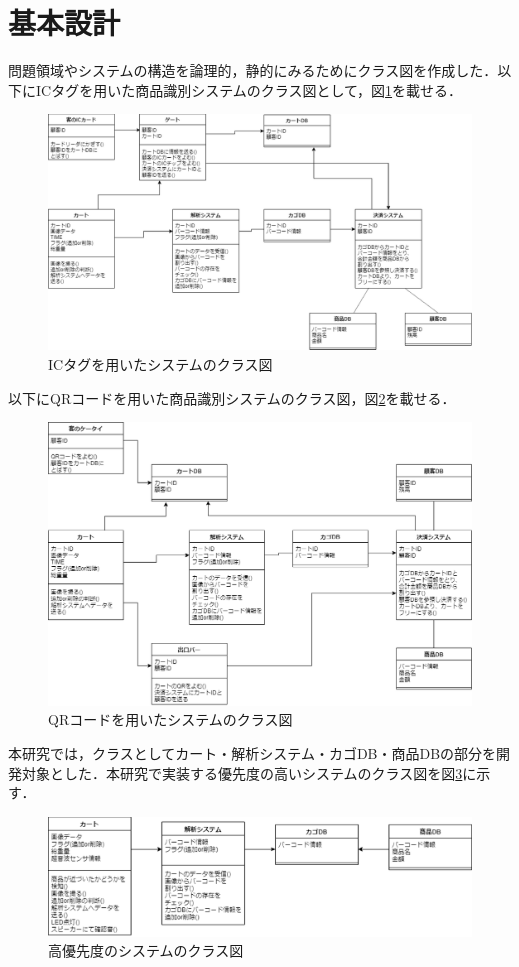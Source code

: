 


\section{基本設計}

問題領域やシステムの構造を論理的，静的にみるためにクラス図を作成した．以下にICタグを用いた商品識別システムのクラス図として，図\ref{class_ic}を載せる．

\begin{figure}[htbp]
\centering
\includegraphics[width=15cm]{./picture/class_ic.eps}
\caption{ICタグを用いたシステムのクラス図}
\label{class_ic}
\end{figure}


以下にQRコードを用いた商品識別システムのクラス図，図\ref{class_qr}を載せる．


\begin{figure}[htbp]
\centering
\includegraphics[width=15cm]{./picture/class_qr.eps}
\caption{QRコードを用いたシステムのクラス図}
\label{class_qr}
\end{figure}


本研究では，クラスとしてカート・解析システム・カゴDB・商品DBの部分を開発対象とした．本研究で実装する優先度の高いシステムのクラス図を図\ref{class_qr_2}に示す．


\begin{figure}[htbp]
\centering
\includegraphics[width=15cm]{./picture/class_qr_2.eps}
\caption{高優先度のシステムのクラス図}
\label{class_qr_2}
\end{figure}